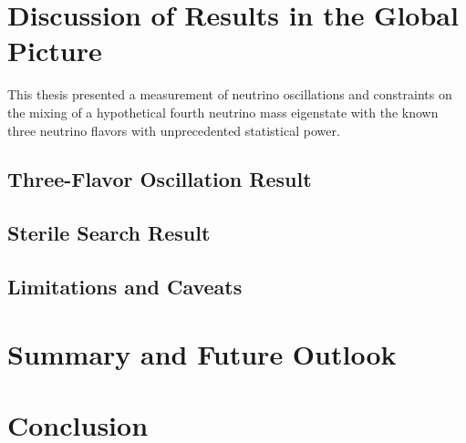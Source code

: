 \setchapterpreamble[u]{\margintoc}
\chapter{Discussion of Results in the Global Picture}

This thesis presented a measurement of neutrino oscillations and constraints on the mixing of a hypothetical fourth neutrino mass eigenstate with the known three neutrino flavors with unprecedented statistical power.

\section{Three-Flavor Oscillation Result}

\section{Sterile Search Result}

\section{Limitations and Caveats}

\setchapterpreamble[u]{\margintoc}
\chapter{Summary and Future Outlook}

\chapter{Conclusion}